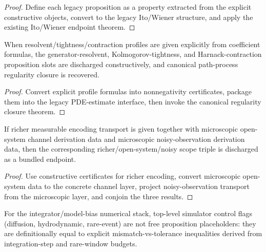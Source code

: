 \begin{proof}
Define each legacy proposition as a property extracted from the explicit constructive objects, convert to the legacy Ito/Wiener structure, and apply the existing Ito/Wiener endpoint theorem.
\end{proof}

\begin{theorem}\label{thm:derived-generator-pde-operator-closure}
When resolvent/tightness/contraction profiles are given explicitly from coefficient formulas, the generator-resolvent, Kolmogorov-tightness, and Harnack-contraction proposition slots are discharged constructively, and canonical path-process regularity closure is recovered.
\end{theorem}

\begin{proof}
Convert explicit profile formulas into nonnegativity certificates, package them into the legacy PDE-estimate interface, then invoke the canonical regularity closure theorem.
\end{proof}

\begin{theorem}\label{thm:microscopic-extension-interface-scope-bundle}
If richer measurable encoding transport is given together with microscopic open-system channel derivation data and microscopic noisy-observation derivation data, then the corresponding richer/open-system/noisy scope triple is discharged as a bundled endpoint.
\end{theorem}

\begin{proof}
Use constructive certificates for richer encoding, convert microscopic open-system data to the concrete channel layer, project noisy-observation transport from the microscopic layer, and conjoin the three results.
\end{proof}

\begin{theorem}\label{thm:numerical-stack-derived-simulator-control-flags}
For the integrator/model-bias numerical stack, top-level simulator control flags (diffusion, hydrodynamic, rare-event) are not free proposition placeholders: they are definitionally equal to explicit mismatch-vs-tolerance inequalities derived from integration-step and rare-window budgets.
\end{theorem}

